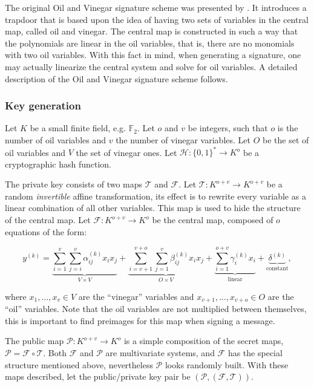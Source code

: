 \documentclass{ufsctex/ufsctex}
\begin{document}
The original Oil and Vinegar signature scheme was presented by
\cite{patarin1997ov}. It introduces a trapdoor that is based upon the idea of
having two sets of variables in the central map, called oil and vinegar. The
central map is constructed in such a way that the polynomials are linear in the
oil variables, that is, there are no monomials with two oil variables. With
this fact in mind, when generating a signature, one may actually linearize the
central system and solve for oil variables. A detailed description of the Oil
and Vinegar signature scheme follows.

\subsubsection{Key generation}

Let $K$ be a small finite field, e.g. $\mathbb{F}_2$. Let $o$ and $v$ be
integers, such that $o$ is the number of oil variables and $v$ the number of
vinegar variables. Let $O$ be the set of oil variables and $V$ the set of
vinegar ones. Let $\mathcal{H}: \{0,1\}^* \to K^o$ be a cryptographic hash
function.

The private key consists of two maps $\mathcal{T}$ and $\mathcal{F}$. Let
$\mathcal{T}: K^{o+v} \to K^{o+v}$ be a random \textit{invertible} affine
transformation, its effect is to rewrite every variable as a linear combination
of all other variables. This map is used to hide the structure of the central
map. Let $\mathcal{F}: K^{o+v} \to K^{o}$ be the central map, composed of $o$
equations of the form:

\begin{equation}\label{eq:ovpolynomial}
y^{(k)} =
\underbrace{\sum_{i=1}^{v}\sum_{j=i}^{v} \alpha^{(k)}_{ij} x_i x_j}_{
V \times V} +
\underbrace{\sum_{i=v+1}^{v+o}\sum_{j=1}^{v} \beta^{(k)}_{ij} x_i x_j}_{
O \times V} +
\underbrace{\sum_{i=1}^{o+v} \gamma^{(k)}_{i} x_i}_{\text{linear}} +
\underbrace{\delta^{(k)}}_{\text{constant}},
\end{equation}

\noindent
where $x_1,\dots,x_v \in V$ are the ``vinegar'' variables and
$x_{v+1},\dots,x_{v+o} \in O$ are the ``oil'' variables. Note that the oil
variables are not multiplied between themselves, this is important to find
preimages for this map when signing a message.

The public map $\mathcal{P}: K^{o+v} \to K^{o}$ is a simple composition of the
secret maps, $\mathcal{P} = \mathcal{F} \circ \mathcal{T}$. Both $\mathcal{F}$
and $\mathcal{P}$ are multivariate systems, and $\mathcal{F}$ has the special
structure mentioned above, nevertheless $\mathcal{P}$ looks randomly built.
With these maps described, let the public/private key pair be
$(\mathcal{P},(\mathcal{F},\mathcal{T}))$.
\end{document}
